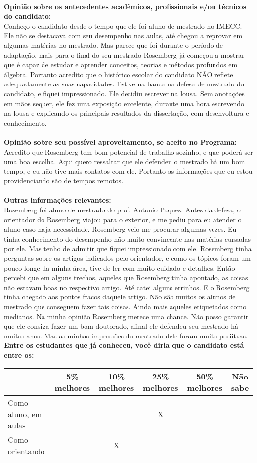 \documentclass[11pt]{article}
\begin{document}
\\
\textbf{Opinião sobre os antecedentes acadêmicos, profissionais e/ou técnicos do candidato:}
\\Conheço o candidato desde o tempo que ele foi aluno de mestrado no IMECC. Ele não se destacava com seu desempenho nas aulas, até chegou a reprovar em algumas matérias no mestrado. Mas parece que foi durante o período de adaptação, mais para o final do seu mestrado Rosemberg já começou a mostrar que é capaz de estudar e aprender conceitos, teorias e métodos  profundos em álgebra. Portanto acredito que o histórico escolar do candidato NÃO reflete adequadamente as suas capacidades. Estive na banca na defesa de mestrado do candidato, e fiquei impressionado. Ele decidiu escrever na lousa. Sem anotações em mãos sequer, ele fez uma exposição excelente, durante uma hora escrevendo na lousa e explicando os principais resultados da dissertação, com desenvoltura e conhecimento.\\
\\
\textbf{Opinião sobre seu possível aproveitamento, se aceito no Programa:}
\\Acredito que Rosemberg tem bom potencial de trabalho sozinho, e que poderá ser uma boa escolha. Aqui quero ressaltar que ele defendeu o mestrado há um bom tempo, e eu não tive mais contatos com ele. Portanto as informações que eu estou providenciando são de tempos remotos.\\ 
\\
\textbf{Outras informações relevantes:} \\Rosemberg foi aluno de mestrado do prof. Antonio Paques. Antes da defesa, o orientador do Rosemberg viajou para o exterior, e me pediu para eu atender o aluno caso haja necessidade. Rosemberg veio me procurar algumas vezes. Eu tinha conhecimento do desempenho não muito convincente nas matérias cursadas por ele. Mas tenho de admitir que fiquei impressionado com ele. Rosemberg tinha perguntas sobre os artigos indicados pelo orientador, e como os tópicos foram um pouco longe da minha área, tive de ler com muito cuidado e detalhes. Então percebi que em alguns trechos, aqueles que Rosemberg tinha apontado, as coisas não estavam boas no respectivo artigo. Até catei alguns errinhos. E o Rosemberg tinha chegado aos pontos fracos daquele artigo. Não são muitos os alunos de mestrado que conseguem fazer tais coisas. Ainda mais aqueles etiquetados como medianos. 
Na minha opinião Rosemberg merece uma chance. Não posso garantir que ele consiga fazer um bom doutorado, afinal ele defendeu seu mestrado há muitos anos. Mas as minhas impressões do mestrado dele foram muito posiitvas.
\\[0.3cm]
\textbf{Entre os estudantes que já conheceu, você diria que o candidato está entre os:}
\\
\begin{tabular}{|l|c|c|c|c|c|}
\hline
 & 5\% melhores & 10\% melhores & 25\% melhores & 50\% melhores & Não sabe \\
\hline
Como aluno, em aulas &  &  & X &  & \\
\hline
Como orientando &  & X &  &  & \\
\hline
\end{tabular}
\end{document}
